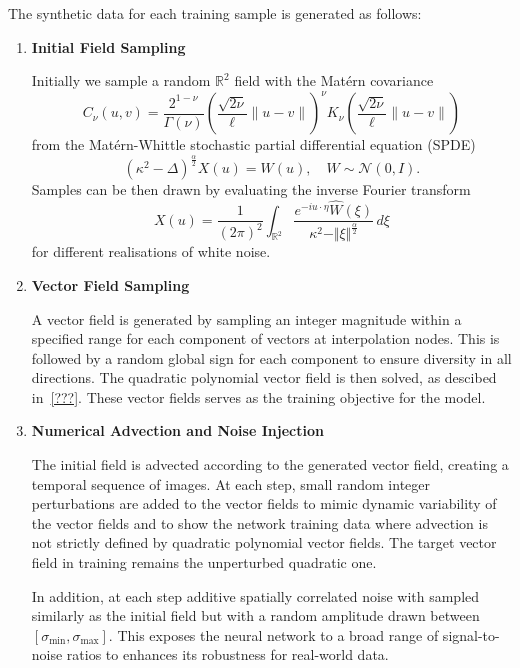 \documentclass[a4paper,12pt]{article}
\begin{document}
The synthetic data for each training sample is generated as follows:
\begin{enumerate}
    \item 
        \textbf{Initial Field Sampling}

        Initially we sample a random $\mathbb{R}^2$ field with the Matérn covariance
        \begin{equation}
            C_{\nu}(u,v) = \frac{2^{1-\nu}}{\Gamma(\nu)} \left(\frac{\sqrt{2\nu}}{\ell} \lVert u - v \rVert\right)^{\nu} K_{\nu}\left(\frac{\sqrt{2\nu}}{\ell} \lVert u - v \rVert \right)
        \end{equation}
        from the Matérn-Whittle stochastic partial differential equation (SPDE)~\cite{whittle63, lindgren}
        \begin{equation}
            (\kappa^2 - \Delta)^{\frac{\alpha}{2}} X(u) = W(u), \quad W \sim \mathcal{N}(0, I).
        \end{equation}
        Samples can be then drawn by evaluating the inverse Fourier transform
        \begin{equation}
            X(u) = \frac{1}{(2 \pi)^2} \int_{\mathbb{R}^2} \frac{e^{-i u \cdot \eta} \hat{W}(\xi)}{\kappa^2 - \Vert \xi \Vert ^{\frac{\alpha}{2}}} \, d \xi
        \end{equation}
        for different realisations of white noise.

    \item 
        \textbf{Vector Field Sampling}

        A vector field is generated by sampling an integer magnitude within a specified range for each component of vectors at interpolation nodes.
        This is followed by a random global sign for each component to ensure diversity in all directions.
        The quadratic polynomial vector field is then solved, as descibed in~\ref{???}.
        These vector fields serves as the training objective for the model.

    \item
        \textbf{Numerical Advection and Noise Injection}

        The initial field is advected according to the generated vector field, creating a temporal sequence of images.
        At each step, small random integer perturbations are added to the vector fields to mimic dynamic variability of the vector fields and to show the network training data where advection is not strictly defined by quadratic polynomial vector fields.
        The target vector field in training remains the unperturbed quadratic one.

        In addition, at each step additive spatially correlated noise with sampled similarly as the initial field but with a random amplitude drawn between $[\sigma_{\text{min}}, \sigma_{\text{max}}]$.
        This exposes the neural network to a broad range of signal-to-noise ratios to enhances its robustness for real-world data.
\end{enumerate}
\end{document}

